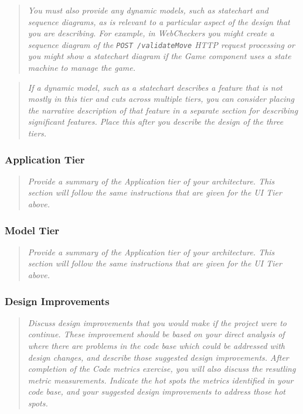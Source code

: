\begin{quote}
\emph{You must also provide any dynamic models, such as statechart and
sequence diagrams, as is relevant to a particular aspect of the design
that you are describing. For example, in WebCheckers you might create a
sequence diagram of the \texttt{POST\ /validateMove} HTTP request
processing or you might show a statechart diagram if the Game component
uses a state machine to manage the game.}
\end{quote}

\begin{quote}
\emph{If a dynamic model, such as a statechart describes a feature that
is not mostly in this tier and cuts across multiple tiers, you can
consider placing the narrative description of that feature in a separate
section for describing significant features. Place this after you
describe the design of the three tiers.}
\end{quote}

\hypertarget{application-tier}{%
\subsubsection{Application Tier}\label{application-tier}}

\begin{quote}
\emph{Provide a summary of the Application tier of your architecture.
This section will follow the same instructions that are given for the UI
Tier above.}
\end{quote}

\hypertarget{model-tier}{%
\subsubsection{Model Tier}\label{model-tier}}

\begin{quote}
\emph{Provide a summary of the Application tier of your architecture.
This section will follow the same instructions that are given for the UI
Tier above.}
\end{quote}

\hypertarget{design-improvements}{%
\subsubsection{Design Improvements}\label{design-improvements}}

\begin{quote}
\emph{Discuss design improvements that you would make if the project
were to continue. These improvement should be based on your direct
analysis of where there are problems in the code base which could be
addressed with design changes, and describe those suggested design
improvements. After completion of the Code metrics exercise, you will
also discuss the resutling metric measurements. Indicate the hot spots
the metrics identified in your code base, and your suggested design
improvements to address those hot spots.}
\end{quote}

